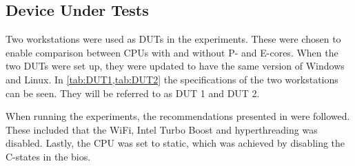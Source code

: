 \subsection{Device Under Tests}
Two workstations were used as DUTs in the experiments. These were chosen to enable comparison between CPUs with and without P- and E-cores. When the two DUTs were set up, they were updated to have the same version of Windows and Linux. In \cref {tab:DUT1,tab:DUT2} the specifications of the two workstations can be seen. They will be referred to as DUT 1 and DUT 2. 




When running the experiments, the recommendations presented in \cite{Lindholt2022} were followed. These included that the WiFi, Intel Turbo Boost and hyperthreading was disabled. Lastly, the CPU was set to static, which was achieved by disabling the C-states in the bios.